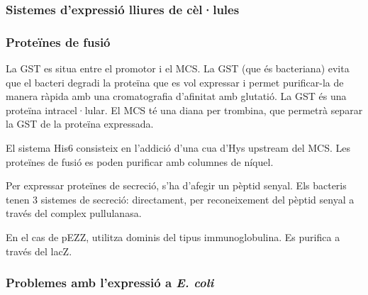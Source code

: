 \subsubsection{Sistemes d'expressió lliures de cèl·lules}
\label{sec:sist-dexpr-lliur}
 


\subsubsection{Proteïnes de fusió}
\label{sec:proteines-de-fusio}

La GST es situa entre el promotor i el MCS. La GST (que és bacteriana)
evita que el bacteri degradi la proteïna que es vol expressar i permet
purificar-la de manera ràpida amb una cromatografia d'afinitat amb
glutatió. La GST és una proteïna intracel·lular. El MCS té una diana
per trombina, que permetrà separar la GST de la proteïna expressada.

El sistema His6 consisteix en l'addició d'una cua d'Hys upstream del
MCS. Les proteïnes de fusió es poden purificar amb columnes de níquel.

Per expressar proteïnes de secreció, s'ha d'afegir un pèptid
senyal. Els bacteris tenen 3 sistemes de secreció: directament, per
reconeixement del pèptid senyal a través del complex pullulanasa.

En el cas de pEZZ, utilitza dominis del tipus immunoglobulina. Es
purifica a través del lacZ.

\subsubsection{Problemes amb l'expressió a \textit{E. coli}}
\label{sec:probl-amb-lexpr}

